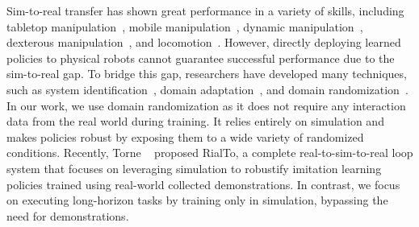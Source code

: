 Sim-to-real transfer has shown great performance in a variety of skills, including tabletop manipulation~\cite{shridhar2021cliport, jiang2024transicsimtorealpolicytransfer}, mobile manipulation~\cite{gu2022multiskill, yenamandra2023homerobot}, dynamic manipulation~\cite{huang2023dynamic}, dexterous manipulation~\cite{chen2023sequential, qin2022dexpointgeneralizablepointcloud,qi2023hand,yin2023rotating}, and locomotion~\cite{DBLP:conf/rss/KumarFPM21,he2024agilesafelearningcollisionfree}. 
However, directly deploying learned policies to physical robots cannot guarantee successful performance due to the sim-to-real gap. 
To bridge this gap, researchers have developed many techniques, such as system identification~\cite{tan2018simtoreal, chang2020sim2real2sim, lim2021planar}, domain adaptation~\cite{bousmalis2018using, arndt2019metareinforcementlearningsimtoreal, rao2020rlcycleganreinforcementlearningaware,james2019sim,du2022bayesian}, and domain randomization~\cite{DBLP:conf/rss/KumarFPM21, openai2019solving, tobin2017domain,antonova2021bayessimig,lee2020learning,peng2018sim,tobin2017domain,chebotar2019closing}. 
In our work, we use domain randomization as it does not require any interaction data from the real world during training. It relies entirely on simulation and makes policies robust by exposing them to a wide variety of randomized conditions. Recently, Torne \etal~\cite{torne2024reconciling} proposed RialTo, a complete real-to-sim-to-real loop system that focuses on leveraging simulation to robustify imitation learning policies trained using real-world collected demonstrations. In contrast, we focus on executing long-horizon tasks by training only in simulation, bypassing the need for demonstrations.

